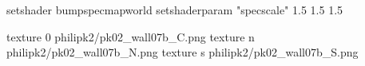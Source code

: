 setshader bumpspecmapworld
setshaderparam "specscale" 1.5 1.5 1.5

texture 0 philipk2/pk02_wall07b_C.png
texture n philipk2/pk02_wall07b_N.png
texture s philipk2/pk02_wall07b_S.png

